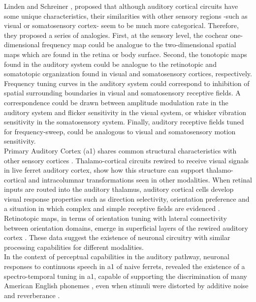 \documentclass[11pt,a4paper]{article}
\begin{document}
Linden and Schreiner \cite{linden03},
proposed that although auditory cortical circuits have some unique characteristics,
their similarities with other sensory regions -such as visual or somatosensory cortex-
seem to be much more categorical.
Therefore, they proposed a series of analogies.
First, at the sensory level, the cochear one-dimensional frequency map
could be analogue to the two-dimensional spatial maps which are found
in the retina or body surface.
Second, the tonotopic maps found in the auditory system could be analogue to the
retinotopic and somatotopic organization found in visual and somatosensory cortices,
respectively.
Frequency tuning curves in the auditory system could correspond to inhibition of
spatial surrounding boundaries in visual and somatosensory receptive fields.
A correspondence could be drawn between amplitude modulation rate
in the auditory system and flicker sensitivity in the visual system, or
whisker vibration sensitivity in the somatosensory system.
Finally, auditory receptive fields tuned for frequency-sweep, could be
analogous to visual and somatosensory motion sensitivity.\\

Primary Auditory Cortex (\ac{a1}) shares common structural
characteristics with other sensory cortices
\cite{huang00, winer92, rockel80, mitani85, mitani85_1}.
Thalamo-cortical circuits rewired to receive
visual signals in live ferret auditory cortex,
show how this structure can support
thalamo-cortical and intracolumnar transformations
seen in other modalities.
When retinal inputs are routed into the auditory thalamus,
auditory cortical cells develop visual response properties
such as direction selectivity,
orientation preference and a situation in which
complex and simple receptive fields are evidenced
\cite{sur88, angelucci98, roe92}.
Retinotopic maps, in terms of orientation tuning with lateral connectivity between
orientation domains, emerge in superficial layers of the rewired
auditory cortex \cite{roe90, sur00}.
These data suggest the existence of neuronal circuitry
with similar processing capabilities for different modalities.\\

In the context of perceptual capabilities in 
the auditory pathway,
neuronal responses to continuous speech in
\ac{a1} of naive ferrets,
revealed the existence of a spectro-temporal tuning
in \ac{a1}, capable of supporting the discrimination
of many American English phonemes \cite{mesgarani08},
even when stimuli were distorted by additive noise and
reverberance \cite{mesgarani14_1}.\\
\end{document}
